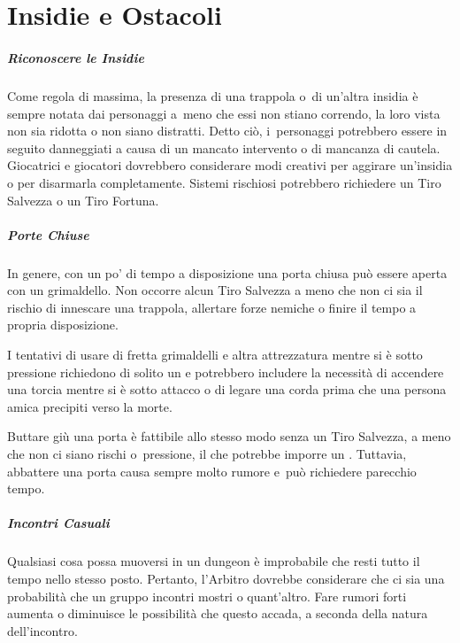 \documentclass[itdr]{subfiles}
\begin{document}
\chapter{Insidie e Ostacoli}
\label{ch:Insidie_e_ostacoli}

\paragraph{Riconoscere le Insidie}
Come regola di massima, la presenza di una trappola o~di un'altra insidia è sempre notata dai personaggi a~meno che essi non stiano correndo, la loro vista non sia ridotta o non siano distratti. Detto ciò, i~personaggi potrebbero essere in seguito danneggiati a causa di un mancato intervento o di mancanza di cautela. Giocatrici e giocatori dovrebbero considerare modi creativi per aggirare un'insidia o per disarmarla completamente. Sistemi rischiosi potrebbero richiedere un Tiro Salvezza o un Tiro Fortuna.

\vfill
\paragraph{Porte Chiuse}
In genere, con un po' di tempo a disposizione una porta chiusa può essere aperta con un grimaldello. Non occorre alcun Tiro Salvezza a meno che non ci sia il rischio di innescare una trappola, allertare forze nemiche o finire il tempo a propria disposizione.

I tentativi di usare di fretta grimaldelli e altra attrezzatura mentre si è sotto pressione richiedono di solito un  e potrebbero includere la necessità di accendere una torcia mentre si è sotto attacco o di legare una corda prima che una persona amica precipiti verso la morte.

Buttare giù una porta è fattibile allo stesso modo senza un Tiro Salvezza, a meno che non ci siano rischi o~pressione, il che potrebbe imporre un . Tuttavia, abbattere una porta causa sempre molto rumore e~può richiedere parecchio tempo.

\vfill
\paragraph{Incontri Casuali}
Qualsiasi cosa possa muoversi in un dungeon è improbabile che resti tutto il tempo nello stesso posto. Pertanto, l'Arbitro dovrebbe considerare che ci sia una probabilità che un gruppo incontri mostri o quant'altro. Fare rumori forti aumenta o diminuisce le possibilità che questo accada, a seconda della natura dell'incontro.
\end{document}
